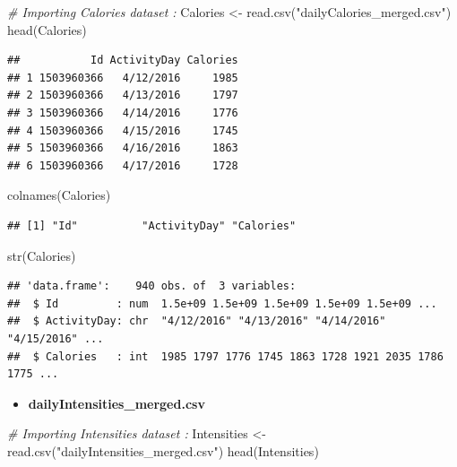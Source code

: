 \documentclass[
]{article}
\newenvironment{Shaded}{\begin{snugshade}}{\end{snugshade}}
\newcommand{\CommentTok}[1]{\textcolor[rgb]{0.56,0.35,0.01}{\textit{#1}}}
\newcommand{\FunctionTok}[1]{\textcolor[rgb]{0.00,0.00,0.00}{#1}}
\newcommand{\NormalTok}[1]{#1}
\newcommand{\OtherTok}[1]{\textcolor[rgb]{0.56,0.35,0.01}{#1}}
\newcommand{\StringTok}[1]{\textcolor[rgb]{0.31,0.60,0.02}{#1}}
\providecommand{\tightlist}{%
  \setlength{\itemsep}{0pt}\setlength{\parskip}{0pt}}
\begin{document}
\begin{Shaded}
\begin{Highlighting}[]
\CommentTok{\# Importing Calories dataset :}
\NormalTok{Calories }\OtherTok{\textless{}{-}} \FunctionTok{read.csv}\NormalTok{(}\StringTok{"dailyCalories\_merged.csv"}\NormalTok{)}
\FunctionTok{head}\NormalTok{(Calories)}
\end{Highlighting}
\end{Shaded}

\begin{verbatim}
##           Id ActivityDay Calories
## 1 1503960366   4/12/2016     1985
## 2 1503960366   4/13/2016     1797
## 3 1503960366   4/14/2016     1776
## 4 1503960366   4/15/2016     1745
## 5 1503960366   4/16/2016     1863
## 6 1503960366   4/17/2016     1728
\end{verbatim}

\begin{Shaded}
\begin{Highlighting}[]
\FunctionTok{colnames}\NormalTok{(Calories)}
\end{Highlighting}
\end{Shaded}

\begin{verbatim}
## [1] "Id"          "ActivityDay" "Calories"
\end{verbatim}

\begin{Shaded}
\begin{Highlighting}[]
\FunctionTok{str}\NormalTok{(Calories)}
\end{Highlighting}
\end{Shaded}

\begin{verbatim}
## 'data.frame':    940 obs. of  3 variables:
##  $ Id         : num  1.5e+09 1.5e+09 1.5e+09 1.5e+09 1.5e+09 ...
##  $ ActivityDay: chr  "4/12/2016" "4/13/2016" "4/14/2016" "4/15/2016" ...
##  $ Calories   : int  1985 1797 1776 1745 1863 1728 1921 2035 1786 1775 ...
\end{verbatim}

\begin{itemize}
\tightlist
\item
  \textbf{dailyIntensities\_merged.csv}
\end{itemize}

\begin{Shaded}
\begin{Highlighting}[]
\CommentTok{\# Importing Intensities dataset :}
\NormalTok{Intensities }\OtherTok{\textless{}{-}} \FunctionTok{read.csv}\NormalTok{(}\StringTok{"dailyIntensities\_merged.csv"}\NormalTok{)}
\FunctionTok{head}\NormalTok{(Intensities)}
\end{Highlighting}
\end{Shaded}
\end{document}
